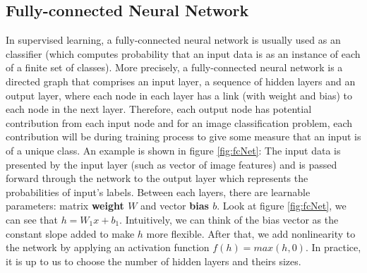 \subsection{Fully-connected Neural Network}
In supervised learning, a fully-connected neural network is usually used as an classifier (which computes probability that an input data is as an instance of each of a finite set of classes). More precisely, a fully-connected neural network is a directed graph that comprises an input layer, a sequence of hidden layers and an output layer, where each node in each layer has a link (with weight and bias) to each node in the next layer. Therefore, each output node has potential contribution from each input node and for an image classification problem, each contribution will be  during training process to give some measure that an input is of a unique class. An example is shown in figure \ref{fig:fcNet}: The input data is presented by the input layer (such as vector of image features) and is passed forward through the network to the output layer which represents the probabilities of input's labels. Between each layers, there are learnable parameters: matrix \textbf{weight $W$} and vector \textbf{bias $b$}. Look at figure \ref{fig:fcNet}, we can see that $h = W_1 x + b_1$. Intuitively, we can think of the bias vector as the constant slope added to make $h$ more flexible. After that, we add nonlinearity to the network by applying an activation function $f(h) = max(h, 0)$. In practice, it is up to us to choose the number of hidden layers and theirs sizes. 

